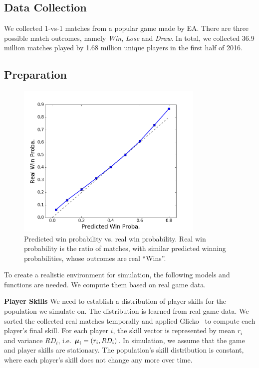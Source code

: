 \subsection{Data Collection}
We collected 1-vs-1 matches from a popular game made by EA. There are three possible match outcomes, namely \emph{Win}, \emph{Lose} and \emph{Draw}. In total, we collected 36.9 million matches played by 1.68 million unique players in the first half of 2016.

\subsection{Preparation}\label{sec:preprosessing}

\begin{figure}[t]
\centering
\includegraphics[width=0.8\textwidth]{Figures/prob_calib_glicko_line.png}
\caption{Predicted win probability vs. real win probability. Real win probability is the ratio of matches, with similar predicted winning probabilities, whose outcomes are real ``Wins''.  }
\label{fig:glicko_cali}
\end{figure}


To create a realistic environment for simulation, the following models and functions are needed. We compute them based on real game data.

\textbf{Player Skills} We need to establish a distribution of player skills for the population we simulate on. The distribution is learned from real game data. We sorted the collected real matches temporally and applied Glicko~\cite{glickman1999parameter} to compute each player's final skill. For each player $i$, the skill vector is represented by mean $r_i$ and variance $RD_i$, i.e. $\boldsymbol{\mu}_i = (r_i, RD_i)$. In simulation, we assume that the game and player skills are stationary. The population's skill distribution is constant, where each player's skill does not change any more over time.

